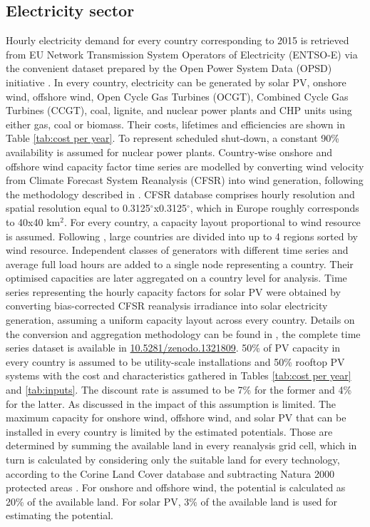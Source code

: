 \documentclass[3p]{elsarticle} %
\begin{document}
\subsection{Electricity sector}
Hourly electricity demand for every country corresponding to 2015 is retrieved from EU Network Transmission System Operators of Electricity (ENTSO-E) via the convenient dataset prepared by the Open Power System Data (OPSD) initiative \cite{OPSD}. In every country, electricity can be generated by solar PV, onshore wind, offshore wind, Open Cycle Gas Turbines (OCGT), Combined Cycle Gas Turbines (CCGT), coal, lignite, and nuclear power plants and CHP units using either gas, coal or biomass. Their costs, lifetimes and efficiencies are shown in Table \ref{tab:cost per year}.  To represent scheduled shut-down, a constant 90\% availability is assumed for nuclear power plants. Country-wise onshore and offshore wind capacity factor time series are modelled by converting wind velocity from Climate Forecast System Reanalysis (CFSR) \cite{CFSR} into wind generation, following the methodology described in \cite{Andresen_2015}. CFSR database comprises hourly resolution and spatial resolution equal to 0.3125$^{\circ}$x0.3125$^{\circ}$, which in Europe roughly corresponds to 40x40 km$^2$. For every country, a capacity layout proportional to wind resource is assumed. Following \cite{Schlachtberger_2017}, large countries are divided into up to 4 regions sorted by wind resource. Independent classes of generators with different time series and average full load hours are added to a single node representing a country. Their optimised capacities are later aggregated on a country level for analysis. Time series representing the hourly capacity factors for solar PV were obtained by converting bias-corrected CFSR reanalysis irradiance into solar electricity generation, assuming a uniform capacity layout across every country. Details on the conversion and aggregation methodology can be found in \cite{Victoria_2019b}, the complete time series dataset is available in \href{https://doi.org/10.5281/zenodo.1321809}{10.5281/zenodo.1321809}. 50\% of PV capacity in every country is assumed to be utility-scale installations and 50\% rooftop PV systems with the cost and characteristics gathered in Tables \ref{tab:cost per year} and \ref{tab:inputs}. The discount rate is assumed to be 7\% for the former and 4\% for the latter. As discussed in \cite{Victoria_2019_EUPVSEC} the impact of this assumption is limited. The maximum capacity for onshore wind, offshore wind, and solar PV that can be installed in every country is limited by the estimated potentials. Those are determined by summing the available land in every reanalysis grid cell, which in turn is calculated by considering only the suitable land for every technology, according to the Corine Land Cover database \cite{Corine_2014} and subtracting Natura 2000 protected areas \cite{Natura2000}. For onshore and offshore wind, the potential is calculated as 20\% of the available land. For solar PV, 3\% of the available land is used for estimating the potential.
\end{document}
